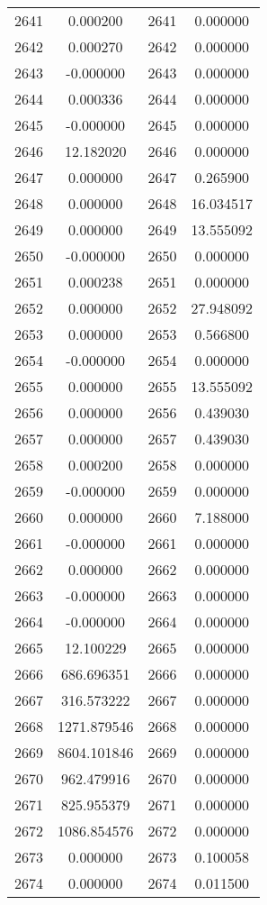 \documentclass[12pt]{article}
\begin{document}
\begin{longtable}{@{}cccc@{}}
2641 & 0.000200 & 2641 & 0.000000 \\
2642 & 0.000270 & 2642 & 0.000000 \\
2643 & -0.000000 & 2643 & 0.000000 \\
2644 & 0.000336 & 2644 & 0.000000 \\
2645 & -0.000000 & 2645 & 0.000000 \\
2646 & 12.182020 & 2646 & 0.000000 \\
2647 & 0.000000 & 2647 & 0.265900 \\
2648 & 0.000000 & 2648 & 16.034517 \\
2649 & 0.000000 & 2649 & 13.555092 \\
2650 & -0.000000 & 2650 & 0.000000 \\
2651 & 0.000238 & 2651 & 0.000000 \\
2652 & 0.000000 & 2652 & 27.948092 \\
2653 & 0.000000 & 2653 & 0.566800 \\
2654 & -0.000000 & 2654 & 0.000000 \\
2655 & 0.000000 & 2655 & 13.555092 \\
2656 & 0.000000 & 2656 & 0.439030 \\
2657 & 0.000000 & 2657 & 0.439030 \\
2658 & 0.000200 & 2658 & 0.000000 \\
2659 & -0.000000 & 2659 & 0.000000 \\
2660 & 0.000000 & 2660 & 7.188000 \\
2661 & -0.000000 & 2661 & 0.000000 \\
2662 & 0.000000 & 2662 & 0.000000 \\
2663 & -0.000000 & 2663 & 0.000000 \\
2664 & -0.000000 & 2664 & 0.000000 \\
2665 & 12.100229 & 2665 & 0.000000 \\
2666 & 686.696351 & 2666 & 0.000000 \\
2667 & 316.573222 & 2667 & 0.000000 \\
2668 & 1271.879546 & 2668 & 0.000000 \\
2669 & 8604.101846 & 2669 & 0.000000 \\
2670 & 962.479916 & 2670 & 0.000000 \\
2671 & 825.955379 & 2671 & 0.000000 \\
2672 & 1086.854576 & 2672 & 0.000000 \\
2673 & 0.000000 & 2673 & 0.100058 \\
2674 & 0.000000 & 2674 & 0.011500 \\

\end{longtable}
\end{document}
